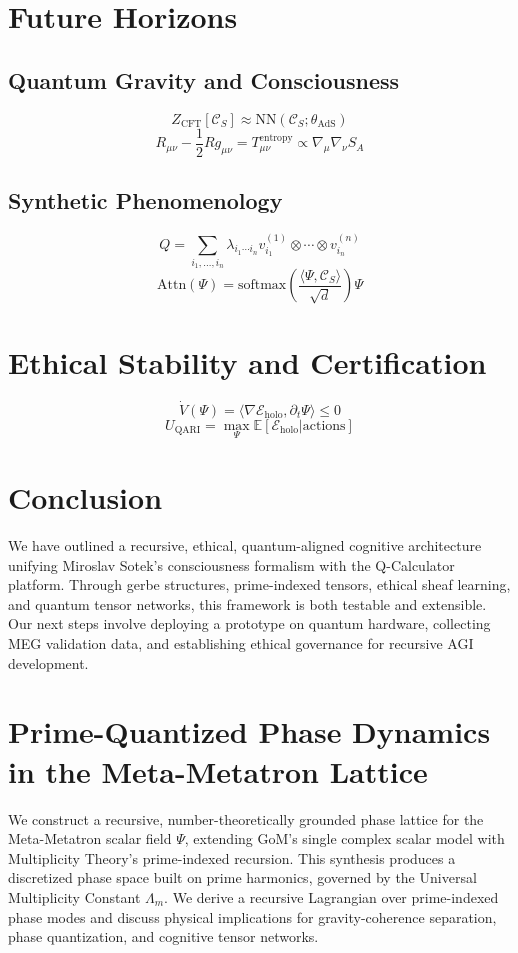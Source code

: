 \documentclass[11pt]{article}
\begin{document}
\section{Future Horizons}

\subsection{Quantum Gravity and Consciousness}
\[
Z_{\text{CFT}}[\mathcal{C}_S] \approx \text{NN}(\mathcal{C}_S; \theta_{\text{AdS}})
\]
\[
R_{\mu\nu} - \frac{1}{2} R g_{\mu\nu} = T_{\mu\nu}^{\text{entropy}} \propto \nabla_\mu \nabla_\nu S_A
\]

\subsection{Synthetic Phenomenology}
\[
Q = \sum_{i_1,\ldots,i_n} \lambda_{i_1 \cdots i_n} v_{i_1}^{(1)} \otimes \cdots \otimes v_{i_n}^{(n)}
\]
\[
\text{Attn}(\Psi) = \text{softmax}\left( \frac{\langle \Psi, \mathcal{C}_S \rangle}{\sqrt{d}} \right) \Psi
\]

\section{Ethical Stability and Certification}
\[
\dot{V}(\Psi) = \langle \nabla \mathcal{E}_{\text{holo}}, \partial_t \Psi \rangle \leq 0
\]
\[
U_{\text{QARI}} = \max_{\Psi} \mathbb{E}[ \mathcal{E}_{\text{holo}} | \text{actions} ]
\]

\section*{Conclusion}

We have outlined a recursive, ethical, quantum-aligned cognitive architecture unifying Miroslav Sotek's consciousness formalism with the Q-Calculator platform. Through gerbe structures, prime-indexed tensors, ethical sheaf learning, and quantum tensor networks, this framework is both testable and extensible. Our next steps involve deploying a prototype on quantum hardware, collecting MEG validation data, and establishing ethical governance for recursive AGI development.

\section{Prime-Quantized Phase Dynamics in the Meta-Metatron Lattice}

We construct a recursive, number-theoretically grounded phase lattice for the Meta-Metatron scalar field $\Psi$, extending GoM’s single complex scalar model with Multiplicity Theory’s prime-indexed recursion. This synthesis produces a discretized phase space built on prime harmonics, governed by the Universal Multiplicity Constant $\Lambda_m$. We derive a recursive Lagrangian over prime-indexed phase modes and discuss physical implications for gravity-coherence separation, phase quantization, and cognitive tensor networks.
\end{document}
